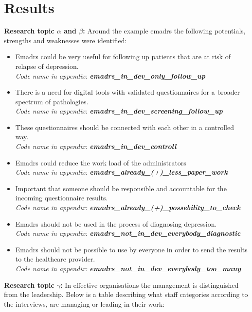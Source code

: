 \documentclass[12pt,a4paper,oneside]{article}
\let\oldcite\cite
\renewcommand*\cite[1]{\textsuperscript{\oldcite{#1}}}
\begin{document}
\section*{Results}
{\bf Research topic $\alpha$ and $\beta$:} Around the example e{\sc madrs} the following potentials, strengths and weaknesses were identified:
\begin{itemize}
\item E{\sc madrs} could be very useful for following up patients that are at risk of relapse of depression.\\{\it Code name in appendix: {\bfseries emadrs\_in\_dev\_only\_follow\_up}}
\item There is a need for digital tools with validated questionnaires for a broader spectrum of pathologies.\\{\it Code name in appendix: {\bfseries emadrs\_in\_dev\_screening\_follow\_up}}
\item These questionnaires should be connected with each other in a controlled way.\\{\it Code name in appendix: {\bfseries emadrs\_in\_dev\_controll}}
\item E{\sc madrs} could reduce the work load of the administrators\\{\it Code name in appendix: {\bfseries emadrs\_already\_(+)\_less\_paper\_work}}
\item Important that someone should be responsible and accountable for the incoming questionnaire results.\\{\it Code name in appendix: {\bfseries emadrs\_already\_(+)\_possebility\_to\_check}}
\item E{\sc madrs} should not be used in the process of diagnosing depression.\\{\it Code name in appendix: {\bfseries emadrs\_not\_in\_dev\_everybody\_diagnostic}}
\item E{\sc madrs} should not be possible to use by everyone in order to send the results to the healthcare provider.\\{\it Code name in appendix: {\bfseries emadrs\_not\_in\_dev\_everybody\_too\_many}}
\end{itemize}
{\bf Research topic $\gamma$:} In effective organisations the management is distinguished from the leadership\cite{leader1}. Below is a table describing what staff categories according to the interviews, are managing or leading in their work:
\end{document}
